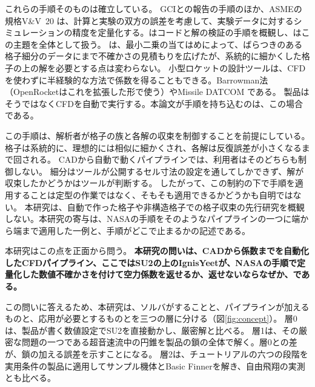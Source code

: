 \documentclass[twocolumn]{labreport}
\begin{document}
これらの手順そのものは確立している。
GCIと\citet{celik2008}の報告の手順のほか、ASMEの規格V\&V~20 \citep{asme2009}は、計算と実験の双方の誤差を考慮して、実験データに対するシミュレーションの精度を定量化する。\citet{roy2005}はコードと解の検証の手順を概観し、\citet{oberkampf2010}はこの主題を全体として扱う。
\citet{eca2014}は、最小二乗の当てはめによって、ばらつきのある格子細分のデータにまで不確かさの見積もりを広げたが、系統的に細かくした格子の上の解を必要とする点は変わらない。
小型ロケットの設計ツールは、CFDを使わずに半経験的な方法で係数を得ることもできる。Barrowman法\citep{barrowman1967}（OpenRocketはこれを拡張した形で使う\citep{niskanen2009}）やMissile DATCOM \citep{blake1998}である。
製品はそうではなくCFDを自動で実行する。本論文が手順を持ち込むのは、この場合である。

この手順は、解析者が格子の族と各解の収束を制御することを前提にしている。格子は系統的に、理想的には相似に細かくされ、各解は反復誤差が小さくなるまで回される。
CADから自動で動くパイプラインでは、利用者はそのどちらも制御しない。
細分はツールが公開するセル寸法の設定を通してしかできず、解が収束したかどうかはツールが判断する。
したがって、この制約の下で手順を適用することは定型の作業ではなく、そもそも適用できるかどうかも自明ではない。
本研究は、自動で作った格子や非構造格子での格子収束の先行研究を概観しない。本研究の寄与は、NASAの手順をそのようなパイプラインの一つに端から端まで適用した一例と、手順がどこで止まるかの記述である。

本研究はこの点を正面から問う。
\textbf{本研究の問いは、CADから係数までを自動化したCFDパイプライン、ここではSU2の上のIgnisYeetが、NASAの手順で定量化した数値不確かさを付けて空力係数を返せるか、返せないならなぜか、である。}

この問いに答えるため、本研究は、ソルバがすることと、パイプラインが加えるものと、応用が必要とするものとを三つの層に分ける（図\ref{fig:concept}）。
層0は、製品が書く数値設定でSU2を直接動かし、厳密解と比べる。
層1は、その厳密な問題の一つである超音速流中の円錐を製品の鎖の全体で解く。層0との差が、鎖の加える誤差を示すことになる。
層2は、チュートリアルの六つの段階を実用条件の製品に適用してサンプル機体とBasic Finnerを解き、自由飛翔の実測とも比べる。
\end{document}
